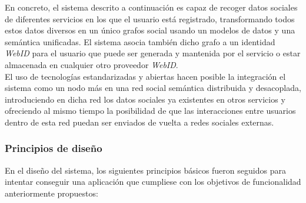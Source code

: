 En concreto, el sistema descrito a continuaci\'on es capaz de recoger datos sociales de diferentes servicios en los que el usuario est\'a registrado, transformando todos estos datos diversos en un \'unico grafos social usando un modelos de datos y una sem\'antica unificadas. El sistema asocia tambi\'en dicho grafo a un identidad \textit{WebID} para el usuario que puede ser generada y mantenida por el servicio o estar almacenada en cualquier otro proveedor \textit{WebID}.\\
El uso de tecnolog\'ias estandarizadas y abiertas hacen posible la integraci\'on el sistema como un nodo m\'as en una red social sem\'antica distribuida y desacoplada, introduciendo en dicha red los datos sociales ya existentes en otros servicios y ofreciendo al mismo tiempo la posibilidad de que las interacciones entre usuarios dentro de esta red puedan ser enviados de vuelta a redes sociales externas.

\subsubsection{Principios de dise\~no}

En el dise\~no del sistema, los siguientes principios b\'asicos fueron seguidos para intentar conseguir una aplicaci\'on que cumpliese con los objetivos de funcionalidad anteriormente propuestos:

